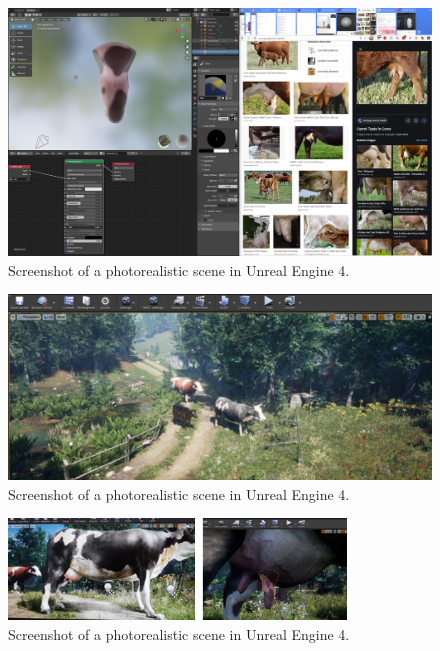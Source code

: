 \begin{figure}[!ht]
    \centering
    \includegraphics[width=.8\textwidth]{images/ndds1}
    \caption{Screenshot of a photorealistic scene in Unreal Engine 4.}
    \label{fig:ue4-1}
\end{figure}
\begin{figure}[!ht]
    \centering
    \includegraphics[width=.8\textwidth]{images/ndds2}
    \caption{Screenshot of a photorealistic scene in Unreal Engine 4.}
    \label{fig:ue4-2}
\end{figure}
\begin{figure}[!ht]
    \centering
    \includegraphics[width=0.8\textwidth]{images/ndds3}
    \caption{Screenshot of a photorealistic scene in Unreal Engine 4.}
    \label{fig:ue4-3}
\end{figure}

